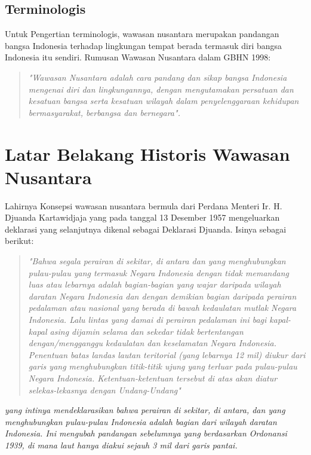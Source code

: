 \documentclass[12pt, a4paper]{article}
\begin{document}
\subsection*{Terminologis}
Untuk Pengertian terminologis, wawasan nusantara merupakan pandangan bangsa Indonesia terhadap lingkungan tempat berada termasuk diri bangsa Indonesia itu sendiri. Rumusan Wawasan Nusantara dalam GBHN 1998\cite{GBHN1998}:

\begin{quote}
\itshape
"Wawasan Nusantara adalah cara pandang dan sikap bangsa Indonesia mengenai diri dan lingkungannya, dengan mengutamakan persatuan dan kesatuan bangsa serta kesatuan wilayah dalam penyelenggaraan kehidupan bermasyarakat, berbangsa dan bernegara".
\end{quote}

\section{Latar Belakang Historis Wawasan Nusantara}
Lahirnya Konsepsi wawasan nusantara bermula dari Perdana Menteri Ir. H. Djuanda Kartawidjaja yang pada tanggal 13 Desember 1957 \cite{hari_nusantara_upi} mengeluarkan deklarasi yang selanjutnya dikenal sebagai Deklarasi Djuanda. Isinya sebagai berikut:

\begin{quote}
\itshape
"Bahwa segala perairan di sekitar, di antara dan yang menghubungkan pulau-pulau yang termasuk Negara Indonesia dengan tidak memandang luas atau lebarnya adalah bagian-bagian yang wajar daripada wilayah daratan Negara Indonesia dan dengan demikian bagian daripada perairan pedalaman atau nasional yang berada di bawah kedaulatan mutlak Negara Indonesia. Lalu lintas yang damai di perairan pedalaman ini bagi kapal-kapal asing dijamin selama dan sekedar tidak bertentangan dengan/mengganggu kedaulatan dan keselamatan Negara Indonesia. Penentuan batas landas lautan teritorial (yang lebarnya 12 mil) diukur dari garis yang menghubungkan titik-titik ujung yang terluar pada pulau-pulau Negara Indonesia. Ketentuan-ketentuan tersebut di atas akan diatur selekas-lekasnya dengan Undang-Undang"
\end{quote}

\textit{yang intinya mendeklarasikan bahwa perairan di sekitar, di antara, dan yang menghubungkan pulau-pulau Indonesia adalah bagian dari wilayah daratan Indonesia. Ini mengubah pandangan sebelumnya yang berdasarkan Ordonansi 1939, di mana laut hanya diakui sejauh 3 mil dari garis pantai.}
\end{document}
